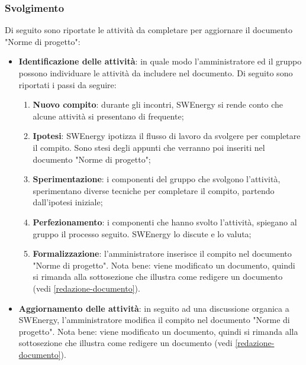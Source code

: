 \subsubsection{Svolgimento}
Di seguito sono riportate le attività da completare per aggiornare il documento
"Norme di progetto":
\begin{itemize}
	\item \textbf{Identificazione delle attività}: in quale modo
	      l'amministratore ed il gruppo possono individuare le attività da
	      includere nel documento. Di seguito sono riportati i passi da
	      seguire:
	      \begin{enumerate}
		      \item \textbf{Nuovo compito}: durante gli incontri,
		            SWEnergy si rende conto che alcune attività si
		            presentano di frequente;

		      \item \textbf{Ipotesi}: SWEnergy ipotizza il flusso di lavoro da
		            svolgere per completare il compito. Sono stesi degli appunti
		            che verranno poi inseriti nel documento "Norme di progetto";

		      \item \textbf{Sperimentazione}: i componenti del gruppo che
		            svolgono l'attività, sperimentano diverse tecniche per
		            completare il compito, partendo dall'ipotesi iniziale;

		      \item \textbf{Perfezionamento}: i componenti che hanno
		            svolto l'attività, spiegano al gruppo il processo
		            seguito. SWEnergy lo discute e lo valuta;

		      \item \textbf{Formalizzazione}: l'amministratore inserisce il
		            compito nel documento "Norme di progetto". Nota bene:
		            viene modificato un documento, quindi si rimanda alla
		            sottosezione che illustra come redigere un documento
		            (vedi \autoref{redazione-documento}).
	      \end{enumerate}

	\item \textbf{Aggiornamento delle attività}: in seguito ad una discussione
	      organica a SWEnergy, l'amministratore modifica il
	      compito nel documento "Norme di progetto". Nota bene:
	      viene modificato un documento, quindi si rimanda alla
	      sottosezione che illustra come redigere un documento
	      (vedi \autoref{redazione-documento}).
\end{itemize}
